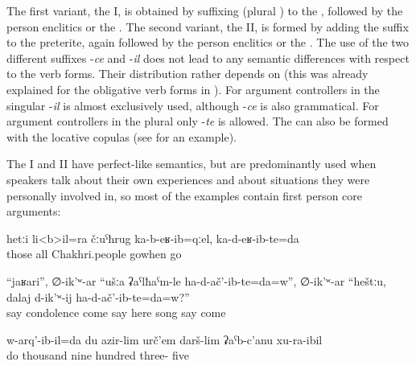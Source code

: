 The first variant, the  I, is obtained by suffixing  (plural ) to the , followed by the person enclitics or the  . The second variant, the  II, is formed by adding the suffix  to the preterite, again followed by the person enclitics or the . The use of the two different suffixes -\textit{ce} and -\textit{il} does not lead to any semantic differences with respect to the  verb forms. Their distribution rather depends on  (this was already explained for the obligative verb forms in ). For argument controllers in the singular -\textit{il} is almost exclusively used, although -\textit{ce} is also grammatical. For argument controllers in the plural only -\textit{te} is allowed. The  can also be formed with the locative copulas (see  for an example).

The  I and II have perfect-like semantics, but are predominantly used when speakers talk about their own experiences and about situations they were personally involved in, so most of the examples contain first person core arguments:

\begin{exe}
	\ex	\label{ex:‎When all Chakhri people moved to the lowlands, we (also) moved}
	\gll	hetːi	li<b>il=ra	čːuˁħrug	ka-b-eʁ-ib=qːel,	ka-d-eʁ-ib-te=da	\\
		those	all	Chakhri.people	gowhen	go\\
	\glt	{}

	\ex	\label{ex:Then Abdulkhalik says, have you come here for making condolence or for singing songs}
	\gll	``jaʁari'',	∅-ik'ʷ-ar	``ušːa	ʡaˁlħaˁm-le	ha-d-ač'-ib-te=da=w'',	∅-ik'ʷ-ar	``heštːu,		dalaj	d-ik'ʷ-ij	ha-d-ač'-ib-te=da=w?''\\
			say		condolence	come	say	here		song	say	come\\
	\glt	{}

	\ex	\label{ex:‎‎‎I was born in 1935 analytic}
	\gll	w-arq'-ib-il=da	du	azir-lim	urč'em	darš-lim	ʡaˁb-c'anu	xu-ra-ibil\\
		do		thousand	nine	hundred	three-	five\\
	\glt	{}
\end{exe}

